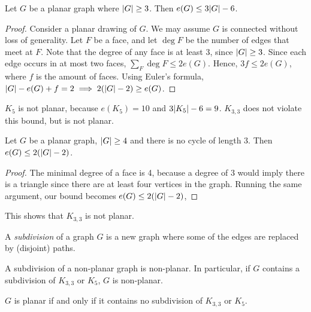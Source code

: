 \begin{corollary}
	Let \( G \) be a planar graph where \( \abs{G} \geq 3 \).
	Then \( e(G) \leq 3\abs{G} - 6 \).
\end{corollary}
\begin{proof}
	Consider a planar drawing of \( G \).
	We may assume \( G \) is connected without loss of generality.
	Let \( F \) be a face, and let \( \deg F \) be the number of edges that meet at \( F \).
	Note that the degree of any face is at least 3, since \( \abs{G} \geq 3 \).
	Since each edge occurs in at most two faces, \( \sum_F \deg F \leq 2e(G) \).
	Hence, \( 3f \leq 2e(G) \), where \( f \) is the amount of faces.
	Using Euler's formula, \( \abs{G} - e(G) + f = 2 \implies 2(\abs{G} - 2) \geq e(G) \).
\end{proof}
\begin{remark}
	\( K_5 \) is not planar, because \( e(K_5) = 10 \) and \( 3 \abs{K_5} - 6 = 9 \).
	\( K_{3,3} \) does not violate this bound, but is not planar.
\end{remark}
\begin{corollary}
	Let \( G \) be a planar graph, \( \abs{G} \geq 4 \) and there is no cycle of length 3.
	Then \( e(G) \leq 2(\abs{G} - 2) \).
\end{corollary}
\begin{proof}
	The minimal degree of a face is 4, because a degree of 3 would imply there is a triangle since there are at least four vertices in the graph.
	Running the same argument, our bound becomes \( e(G) \leq 2(\abs{G} - 2) \),
\end{proof}
This shows that \( K_{3,3} \) is not planar.
\begin{definition}
	A \emph{subdivision} of a graph \( G \) is a new graph where some of the edges are replaced by (disjoint) paths.
\end{definition}
\begin{remark}
	A subdivision of a non-planar graph is non-planar.
	In particular, if \( G \) contains a subdivision of \( K_{3,3} \) or \( K_5 \), \( G \) is non-planar.
\end{remark}
\begin{theorem}[Kuratowski]
	\( G \) is planar if and only if it contains no subdivision of \( K_{3,3} \) or \( K_5 \).
\end{theorem}
